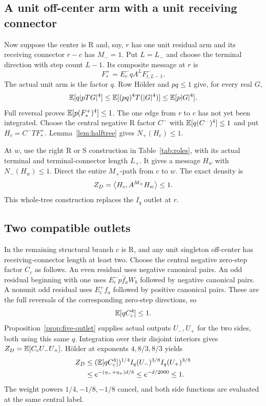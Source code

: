 \subsection{A unit off-center arm with a unit receiving connector}
Now suppose the center is R and, say, $r$ has one unit residual arm
and its receiving connector $r-c$ has $M_-=1$. Put $L=L_-$ and choose the terminal direction with
step count $L-1$. Its composite message at $r$ is
\[
 F_*^+=E_r^-qA^LF^-_{t,L-1}.
\]
The actual unit arm is the factor $q$. Row H\"older and $pq\le1$ give,
for every real $G$,
\[
 \mathbb E[q|pTG|^4]\le\mathbb E[(pq)^4T(|G|^4)]\le\mathbb E[p|G|^4].
\]
Full reversal proves $\mathbb E[p(F_*^+)^4]\le1$. The one edge from $r$ to
$c$ has not yet been integrated. Choose the central negative R factor
$C^-$ with $\mathbb E[q(C^-)^4]\le1$ and put $H_c=C^-TF_*^+$.
Lemma~\ref{lem:halftree} gives $N_+(H_c)\le1$.

At $w$, use the right R or S construction in Table~\ref{tab:roles},
with its actual terminal and terminal-connector length $L_+$. It gives a message
$H_w$ with $N_-(H_w)\le1$. Direct the entire $M_+$-path from $c$ to
$w$. The exact density is
\[
 Z_D=\left\langle H_c,A^{M_+}H_w\right\rangle\le1.
\]
This whole-tree construction replaces the $I_q$ outlet at $r$.

\subsection{Two compatible outlets}
In the remaining structural branch $c$ is R, and any unit singleton
off-center has receiving-connector length at least two. Choose the central negative
zero-step factor $C_c$ as follows. An even residual uses negative
canonical pairs. An odd residual beginning with one uses
$E_c^-p\bar f_aW_b$ followed by negative canonical pairs. A nonunit
odd residual uses $E_c^+f_a$ followed by positive canonical pairs.
These are the full reversals of the corresponding zero-step
directions, so
\[
 \mathbb E[qC_c^4]\le1.
\]
Proposition~\ref{prop:five-outlet} supplies actual outputs $U_-,U_+$
for the two sides, both using this same $q$. Integration over their
disjoint interiors gives $Z_D=\mathbb E[C_cU_-U_+]$.
H\"older at exponents $4,8/3,8/3$ yields
\begin{align}\label{eq:five-chain-close}
 Z_D&\le(\mathbb E[qC_c^4])^{1/4}
             I_q(U_-)^{3/8}I_q(U_+)^{3/8}\notag\\
 &\le e^{-(\eta_-+\eta_+)d/8}\le e^{-d/2000}\le1.
\end{align}
The weight powers $1/4,-1/8,-1/8$ cancel, and both side functions are evaluated at the same central label.

